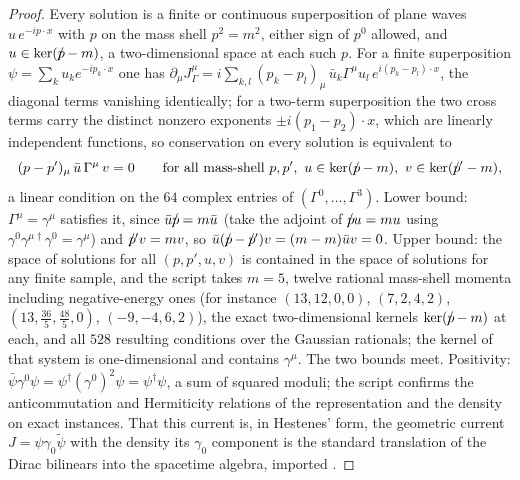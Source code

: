 \documentclass[11pt]{article}
\theoremstyle{definition}
\theoremstyle{plain}
\providecommand{\slashed}{}\renewcommand{\slashed}[1]{{#1}\mkern-10mu/}
\begin{document}
\begin{proof}
Every solution is a finite or continuous superposition of plane waves $u\,e^{-ip\cdot x}$ with $p$ on the mass shell $p^{2} = m^{2}$, either sign of $p^{0}$ allowed, and $u \in \ker(\slashed{p} - m)$, a two-dimensional space at each such $p$. For a finite superposition $\psi = \sum_{k} u_{k}e^{-ip_{k}\cdot x}$ one has $\partial_{\mu}J^{\mu}_{\Gamma} = i\sum_{k,l}(p_{k} - p_{l})_{\mu}\,\bar{u}_{k}\Gamma^{\mu}u_{l}\,e^{i(p_{k} - p_{l})\cdot x}$, the diagonal terms vanishing identically; for a two-term superposition the two cross terms carry the distinct nonzero exponents $\pm i(p_{1} - p_{2})\cdot x$, which are linearly independent functions, so conservation on every solution is equivalent to
\[
(p - p')_{\mu}\,\bar{u}\,\Gamma^{\mu}\,v = 0 \qquad \text{for all mass-shell } p, p',\ u \in \ker(\slashed{p} - m),\ v \in \ker(\slashed{p}' - m),
\]
a linear condition on the $64$ complex entries of $(\Gamma^{0}, \dots, \Gamma^{3})$. Lower bound: $\Gamma^{\mu} = \gamma^{\mu}$ satisfies it, since $\bar{u}\slashed{p} = m\bar{u}$ (take the adjoint of $\slashed{p}u = mu$ using $\gamma^{0}\gamma^{\mu\dagger}\gamma^{0} = \gamma^{\mu}$) and $\slashed{p}'v = mv$, so $\bar{u}(\slashed{p} - \slashed{p}')v = (m - m)\bar{u}v = 0$. Upper bound: the space of solutions for all $(p, p', u, v)$ is contained in the space of solutions for any finite sample, and the script takes $m = 5$, twelve rational mass-shell momenta including negative-energy ones (for instance $(13, 12, 0, 0)$, $(7, 2, 4, 2)$, $(13, \tfrac{36}{5}, \tfrac{48}{5}, 0)$, $(-9, -4, 6, 2)$), the exact two-dimensional kernels $\ker(\slashed{p} - m)$ at each, and all $528$ resulting conditions over the Gaussian rationals; the kernel of that system is one-dimensional and contains $\gamma^{\mu}$. The two bounds meet. Positivity: $\bar{\psi}\gamma^{0}\psi = \psi^{\dagger}(\gamma^{0})^{2}\psi = \psi^{\dagger}\psi$, a sum of squared moduli; the script confirms the anticommutation and Hermiticity relations of the representation and the density on exact instances. That this current is, in Hestenes' form, the geometric current $J = \psi\gamma_{0}\tilde{\psi}$ with the density its $\gamma_{0}$ component is the standard translation of the Dirac bilinears into the spacetime algebra, imported \cite{Hestenes1975}.

\end{proof}
\end{document}
